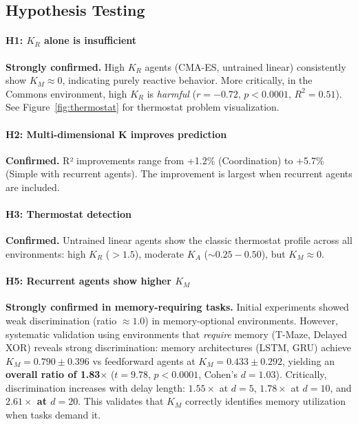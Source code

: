 \documentclass[11pt,a4paper]{article}
\newcommand{\kr}{K_R}
\newcommand{\ka}{K_A}
\newcommand{\km}{K_M}
\begin{document}
\subsection{Hypothesis Testing}

\paragraph{H1: $\kr$ alone is insufficient} \textbf{Strongly confirmed.} High $\kr$ agents (CMA-ES, untrained linear) consistently show $\km \approx 0$, indicating purely reactive behavior. More critically, in the Commons environment, high $\kr$ is \emph{harmful} ($r = -0.72$, $p < 0.0001$, $R^2 = 0.51$). See Figure~\ref{fig:thermostat} for thermostat problem visualization.

\paragraph{H2: Multi-dimensional K improves prediction} \textbf{Confirmed.} R² improvements range from +1.2\% (Coordination) to +5.7\% (Simple with recurrent agents). The improvement is largest when recurrent agents are included.

\paragraph{H3: Thermostat detection} \textbf{Confirmed.} Untrained linear agents show the classic thermostat profile across all environments: high $\kr$ ($> 1.5$), moderate $\ka$ ($\sim 0.25-0.50$), but $\km \approx 0$.

\paragraph{H5: Recurrent agents show higher $\km$} \textbf{Strongly confirmed in memory-requiring tasks.} Initial experiments showed weak discrimination (ratio $\approx 1.0$) in memory-optional environments. However, systematic validation using environments that \emph{require} memory (T-Maze, Delayed XOR) reveals strong discrimination: memory architectures (LSTM, GRU) achieve \textbf{$\km = 0.790 \pm 0.396$} vs feedforward agents at \textbf{$\km = 0.433 \pm 0.292$}, yielding an \textbf{overall ratio of 1.83$\times$} ($t = 9.78$, $p < 0.0001$, Cohen's $d = 1.03$). Critically, discrimination increases with delay length: $1.55\times$ at $d=5$, $1.78\times$ at $d=10$, and \textbf{$2.61\times$ at $d=20$}. This validates that $\km$ correctly identifies memory utilization when tasks demand it.
\end{document}
